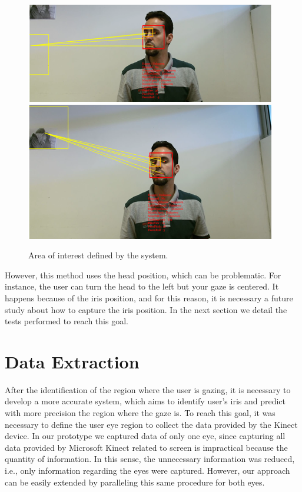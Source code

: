 \documentclass[10pt, conference]{IEEEtran}
\begin{document}
    \begin{figure}[t]
        \centering
        \includegraphics{figures/pic9a.png}\\
        \includegraphics{figures/pic9b.png}\\    
        \caption{Area of interest defined by the system.}
        \label{fig:fig9}
    \end{figure}

	However, this method uses the head position, which can be problematic.
	For instance, the user can turn the head to the left but your gaze is centered. 
	It happens because of the iris position, and for this reason, it is necessary a future study about how to capture the iris position. 
    In the next section we detail the tests performed to reach this goal.

\section{Data Extraction} \label{sec:dataExtraction}

	After the identification of the region where the user is gazing, it is necessary to develop a more accurate system, which aims to identify user’s iris and predict with more precision the region where the gaze is. 
	To reach this goal, it was necessary to define the user eye region to collect the data provided by the Kinect device.
	In our prototype we captured data of only one eye, since capturing all data provided by Microsoft Kinect related to screen is impractical because the quantity of information.
	In this sense, the unnecessary information was reduced, i.e., only information regarding the eyes were captured.
    However, our approach can be easily extended by paralleling this same procedure for both eyes.
\end{document}
